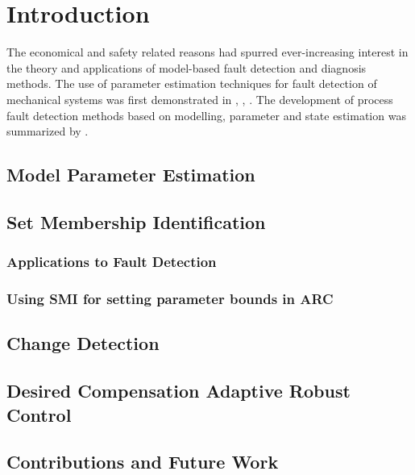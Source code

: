 \chapter{Introduction}
The economical and safety related reasons had spurred ever-increasing interest in the theory and applications of model-based fault detection and diagnosis methods. The use of parameter estimation techniques for fault detection of mechanical systems was first demonstrated in \cite{baskiotis1979parameter}, \cite{geiger1982monitoring} \cite{filbert1982quality}, \cite{hohmann1977automatic}. The development of process fault detection methods based on modelling, parameter and state estimation was summarized by \cite{isermann1984process}.





\section{Model Parameter Estimation}
\section{Set Membership Identification}
\subsection{Applications to Fault Detection}
\subsection{Using SMI for setting parameter bounds in ARC}
\section{Change Detection}
\section{Desired Compensation Adaptive Robust Control}
\section{Contributions and Future Work}
